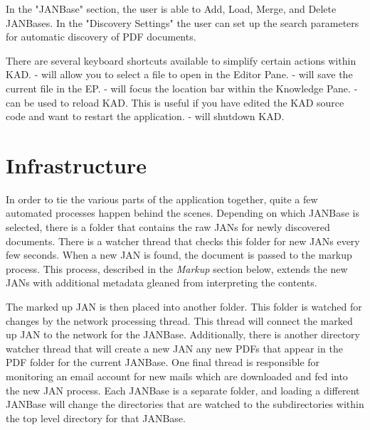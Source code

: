 \documentclass{article}
\begin{document}
\begin{doublespace}
In the "JANBase" section, the user is able to Add, Load, Merge, and Delete JANBases.
In the "Discovery Settings" the user can set up the search parameters for automatic discovery of PDF documents.
\par
There are several keyboard shortcuts available to simplify certain actions within KAD.
 -  will allow you to select a file to open in the Editor Pane.
 -  will save the current file in the EP.
 -  will focus the location bar within the Knowledge Pane.
 -  can be used to reload KAD.
This is useful if you have edited the KAD source code and want to restart the application.
 -  will shutdown KAD.
\section{Infrastructure}
In order to tie the various parts of the application together,
quite a few automated processes happen behind the scenes.
Depending on which JANBase is selected, there is a folder that contains the raw JANs for newly discovered documents.
There is a watcher thread that checks this folder for new JANs every few seconds.
When a new JAN is found, the document is passed to the markup process.
This process, described in the {\it Markup} section below, extends the new JANs with additional metadata gleaned
from interpreting the contents.
\par
The marked up JAN is then placed into another folder.
This folder is watched for changes by the network processing thread.
This thread will connect the marked up JAN to the network for the JANBase.
Additionally, there is another directory watcher thread that will create a new JAN any new PDFs that appear in
the PDF folder for the current JANBase.
One final thread is responsible for monitoring an email account for new mails which are downloaded and fed into the new JAN process.
Each JANBase is a separate folder, and loading a different JANBase will change the directories that are watched
to the subdirectories within the top level directory for that JANBase. 

\end{doublespace}
\end{document}
